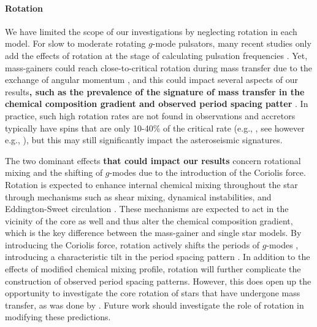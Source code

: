 \documentclass[desactivate]{aa}
\newcommand{\referee}[1]{{\bf #1}}
\begin{document}


\paragraph{Rotation} We have limited the scope of our investigations by neglecting rotation in each model. For slow to moderate rotating $g$-mode pulsators, many recent studies only add the effects of rotation at the stage of calculating pulsation frequencies \citep[e.g.][]{Michielsen+2021}. Yet, mass-gainers could reach close-to-critical rotation during mass transfer due to the exchange of angular momentum \citep{Packet+1981, deMink+2013:2013ApJ...764..166D, Renzo+2021}, and this could impact several aspects of our results\referee{, such as the prevalence of the signature of mass transfer in the chemical composition gradient and observed period spacing patter} \citep[e.g.][and references therein]{Aerts+2023:2023arXiv231108453A}. In practice, such high rotation rates are not found in observations and accretors typically have spins that are only 10-40\% of the critical rate (e.g., \citealp{Dervisoglu+2010}, see however e.g., \citealp{Zehe+2018:2018AN....339...46Z}), but this may still significantly impact the asteroseismic signatures.

The two dominant effects \referee{that could impact our results} concern rotational mixing and the shifting of $g$-modes due to the introduction of the Coriolis force. Rotation is expected to enhance internal chemical mixing throughout the star through mechanisms such as shear mixing, dynamical instabilities, and Eddington-Sweet circulation \citep{Maeder2000}. These mechanisms are expected to act in the vicinity of the core as well and thus alter the chemical composition gradient, which is the key difference between the mass-gainer and single star models. By introducing the Coriolis force, rotation actively shifts the periods of $g$-modes \citep{Townsend2003}, introducing a characteristic tilt in the period spacing pattern \citep{Bouabid+2013}. In addition to the effects of modified chemical mixing profile, rotation will further complicate the construction of observed period spacing patterns. However, this does open up the opportunity to investigate the core rotation of stars that have undergone mass transfer, as was done by \citet{Guo2019}. Future work should investigate the role of rotation in modifying these predictions.
\end{document}
